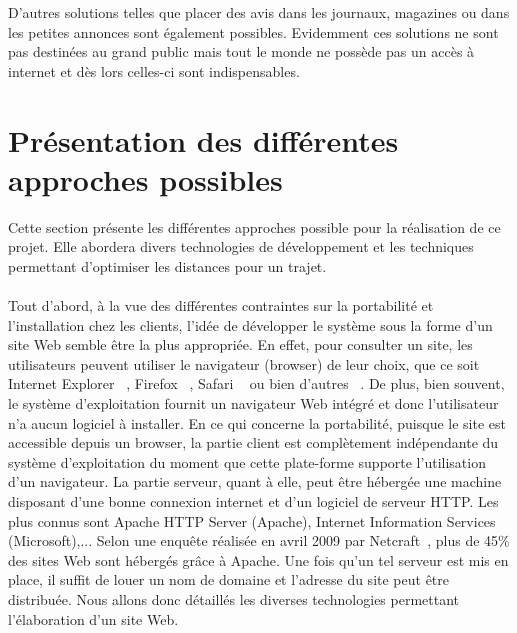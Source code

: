 \documentclass[12pt, a4paper, oneside]{article}
\begin{document}
    \indent D'autres solutions telles que placer des avis dans les journaux, magazines ou dans les petites annonces sont également possibles. Evidemment ces solutions ne sont pas destinées au grand public mais tout le monde ne possède pas un accès à internet et dès lors celles-ci sont indispensables.
\section{Présentation des différentes approches possibles}
    Cette section présente les différentes approches possible pour la réalisation de ce projet. Elle abordera divers technologies de développement et les techniques permettant d'optimiser les distances pour un trajet.\\\\
    \indent Tout d'abord, à la vue des différentes contraintes sur la portabilité et l'installation chez les clients, l'idée de développer le système sous la forme d'un site Web semble être la plus appropriée. En effet, pour consulter un site, les utilisateurs peuvent utiliser le navigateur (browser) de leur choix, que ce soit Internet Explorer ~\cite{internet-explorer}, Firefox ~\cite{firefox}, Safari ~\cite{safari} ou bien d'autres ~\cite{browser-list}. De plus, bien souvent, le système d'exploitation fournit un navigateur Web intégré et donc l'utilisateur n'a aucun logiciel à installer. En ce qui concerne la portabilité, puisque le site est accessible depuis un browser, la partie client est complètement indépendante du système d'exploitation du moment que cette plate-forme supporte l'utilisation d'un navigateur. La partie serveur, quant à elle, peut être hébergée une machine disposant d'une bonne connexion internet et d'un logiciel de serveur HTTP. Les plus connus sont Apache HTTP Server (Apache), Internet Information Services (Microsoft),... Selon une enquête réalisée en avril 2009 par Netcraft~\cite{server-survey}, plus de 45$\%$ des sites Web sont hébergés grâce à Apache. Une fois qu'un tel serveur est mis en place, il suffit de louer un nom de domaine et l'adresse du site peut être distribuée. Nous allons donc détaillés les diverses technologies permettant l'élaboration d'un site Web.\\\\
\end{document}
